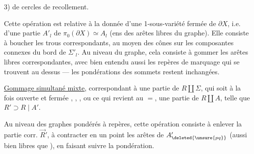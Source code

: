 
3)   de cercles de recollement.

Cette opération est relative à la donnée d'une 1-sous-variété fermée de $\partial X$, i.e. d'une partie $A'_l$ de $\pi_0(\partial X)\simeq A_l$ (ens des arêtes libres du graphe).
Elle consiste à boucher les trous correspondants, au moyen des cônes sur les composantes connexes du bord de $\Sigma'_l$.
Au niveau du graphe, cela consiste à gommer les arêtes libres correspondantes, avec bien entendu aussi les repères de marquage qui se trouvent au dessus ---  les pondérations des sommets restent inchangées.

\uline{Gommage simultané mixte},  correspondant à une partie
   de $R\amalg\Sigma$,
qui soit à la fois ouverte et fermée 
,
,
,
ou ce qui revient au $=$, une partie  de $R\amalg A$, telle que $R'\supset R\mid A'$.

Au niveau des graphes pondérés à repères, cette opération consiste à enlever   la partie corr. $\vec R'$, à contracter en un point les arêtes de $A'_{\deleted{\unsure{pq}}}$ (aussi bien libres que ), en faisant suivre la pondération.
